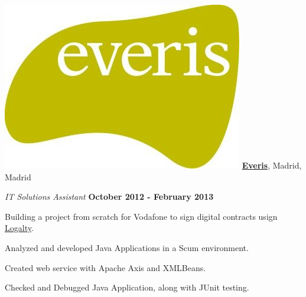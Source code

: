 \includegraphics[scale=0.1]{companies/everis.jpg} \href{http://www.everis.es/}{\textbf{Everis}},
Madrid, Madrid
\begin{outerlist}

\item[] \textit{IT Solutions Assistant}%
        \hfill \textbf{October 2012 - February 2013}
\begin{innerlist}
\item Building a project from scratch for Vodafone to sign digital contracts usign \href{https://logalty.com/en/}{Logalty}.
\item Analyzed and developed Java Applications in a Scum environment.
\item Created web service with Apache Axis and XMLBeans.
\item Checked and Debugged Java Application, along with JUnit testing.
\end{innerlist}%
\end{outerlist}

